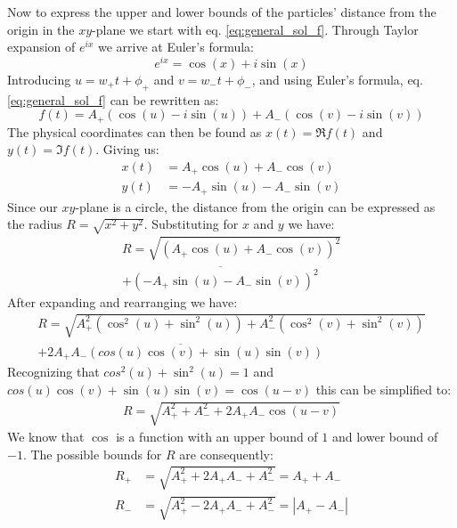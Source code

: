 \documentclass[english,notitlepage,reprint,nofootinbib]{revtex4-1}  %
\begin{document}
Now to express the upper and lower bounds of the particles' distance from the origin in the $xy$-plane 
we start with eq. \ref*{eq:general_sol_f}. Through Taylor expansion of $e^{ix}$ we arrive at Euler's formula:
\begin{equation*}
    e^{ix} = \cos(x) + i \sin(x)
\end{equation*} 
Introducing $u =  w_+ t + \phi_+$ and $v = w_- t + \phi_-$, and using 
Euler's formula, eq. \ref*{eq:general_sol_f} can be rewritten as:
\begin{equation*}
    f(t) = A_+\left(\cos(u) - i \sin(u) \right) + A_-\left(\cos(v) - i \sin(v) \right)
\end{equation*}
The physical coordinates can then be found as $x(t) = \Re f(t)$ and  $y(t) = \Im f(t)$. Giving us:
\begin{align*}
    x(t) &= A_+ \cos(u) + A_- \cos(v) \\
    y(t) &= -A_+ \sin(u) - A_- \sin(v)
\end{align*}
Since our $xy$-plane is a circle, the distance from the origin can be expressed as the radius $R = \sqrt{x^2 + y^2}$. 
Substituting for $x$ and $y$ we have:
\begin{align*}
    R = \sqrt{(A_+ \cos(u) + A_- \cos(v))^2} \\ \overline{+ (-A_+ \sin(u) - A_- \sin(v))^2}
\end{align*}
After expanding and rearranging we have:
\begin{align*}
   R = \sqrt{A_+^2(\cos^2(u) + \sin^2(u)) + A_-^2(\cos^2(v) + \sin^2(v))} \\ \overline{ + 2 A_+ A_- (cos(u)\cos(v) + \sin(u)\sin(v))}
\end{align*}
Recognizing that $cos^2(u) + \sin^2(u) = 1$ and $cos(u)\cos(v) + \sin(u)\sin(v) = \cos(u-v)$ this can be simplified to:
\begin{align*}
    R = \sqrt{A_+^2 + A_-^2 + 2 A_+ A_- \cos(u-v)}
\end{align*}
We know that $\cos$ is a function with an upper bound of $1$ and lower bound of $-1$. 
The possible bounds for $R$ are consequently:
\begin{align*}
    R_+ &= \sqrt{A_+^2 +2A_+ A_- + A_-^2} = A_+ + A_- \\
    R_- &= \sqrt{A_+^2 -2A_+ A_- + A_-^2} = |A_+ - A_-|
\end{align*}
\end{document}
